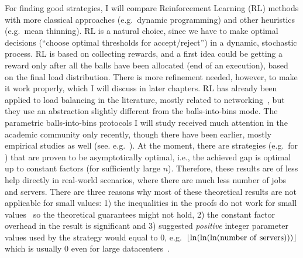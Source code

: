 For finding good strategies, I will compare Reinforcement Learning (RL) methods with more classical approaches (e.g.\ dynamic programming) and other heuristics (e.g.\ mean thinning). RL is a natural choice, since we have to make optimal decisions (``choose optimal thresholds for accept/reject'') in a dynamic, stochastic process. RL is based on collecting rewards, and a first idea could be getting a reward only after all the balls have been allocated (end of an execution), based on the final load distribution. There is more refinement needed, however, to make it work properly, which I will discuss in later chapters. RL has already been applied to load balancing in the literature, mostly related to networking~\cite{attiah2020RLcellular, yeo2021controller}, but they use an abstraction slightly different from the balls-into-bins mode. The parametric balls-into-bins protocols I will study received much attention in the academic community only recently, though there have been earlier, mostly empirical studies as well (see. e.g.~\cite{derek1986twothinningfirstattempt}). At the moment, there are strategies (e.g.\ for \TwoThinning) that are proven to be asymptotically optimal, i.e., the achieved gap is optimal up to constant factors (for sufficiently large $n$). Therefore, these results are of less help directly in real-world scenarios, where there are much less number of jobs and servers. There are three reasons why most of these theoretical results are not applicable for small values: 1) the inequalities in the proofs do not work for small values~\cite{feldheim2021longtermthinning} so the theoretical guarantees might not hold, 2) the constant factor overhead in the result is significant and 3) suggested \textit{positive} integer parameter values used by the strategy would equal to $0$, e.g.\ $\floor{\ln(\ln(\ln(\mathrm{number\ of\ servers})))}$ which is usually $0$ even for large datacenters~\cite{uzaman2019datacentersize}.

